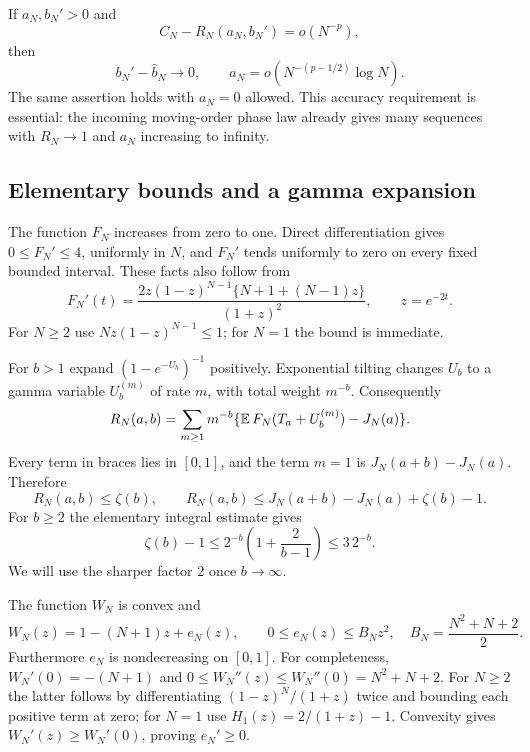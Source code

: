 \begin{theorem}\label{eul:thm:near}
If $a_N,b_N'>0$ and
\[
 C_N-R_N(a_N,b_N')=o(N^{-p}),
\]
then
\[
 b_N'-\widehat b_N\longrightarrow0,
 \qquad
 a_N=o\!\left(N^{-(p-1/2)}\log N\right).
\]
The same assertion holds with $a_N=0$ allowed.  This accuracy requirement
is essential: the incoming moving-order phase law already gives many
sequences with $R_N\to1$ and $a_N$ increasing to infinity.
\end{theorem}

\subsection{Elementary bounds and a gamma expansion}
The function $F_N$ increases from zero to one.  Direct differentiation
gives $0\leq F_N'\leq4$, uniformly in $N$, and $F_N'$ tends uniformly
to zero on every fixed bounded interval.  These facts also follow from
\[
 F_N'(t)=\frac{2z(1-z)^{N-1}\{N+1+(N-1)z\}}{(1+z)^2},
 \qquad z=e^{-2t}.
\]
For $N\geq2$ use $Nz(1-z)^{N-1}\leq1$; for $N=1$ the bound is
immediate.

For $b>1$ expand $(1-e^{-U_b})^{-1}$ positively.  Exponential tilting
changes $U_b$ to a gamma variable $U_b^{(m)}$ of rate $m$, with total
weight $m^{-b}$.  Consequently
\begin{equation}\label{eul:eq:seriesR}
 R_N(a,b)=\sum_{m\geq1}m^{-b}
  \{\operatorname{\mathbb E} F_N(T_a+U_b^{(m)})-J_N(a)\}.
\end{equation}
Every term in braces lies in $[0,1]$, and the term $m=1$ is
$J_N(a+b)-J_N(a)$.  Therefore
\begin{equation}\label{eul:eq:rough}
 R_N(a,b)\leq\zeta(b),\qquad
 R_N(a,b)\leq J_N(a+b)-J_N(a)+\zeta(b)-1.
\end{equation}
For $b\geq2$ the elementary integral estimate gives
\begin{equation}\label{eul:eq:zetabound}
 \zeta(b)-1\leq2^{-b}\left(1+\frac2{b-1}\right)\leq3\,2^{-b}.
\end{equation}
We will use the sharper factor $2$ once $b\to\infty$.

The function $W_N$ is convex and
\begin{equation}\label{eul:eq:etaylor}
 W_N(z)=1-(N+1)z+e_N(z),\qquad
 0\leq e_N(z)\leq B_Nz^2,
 \quad B_N=\frac{N^2+N+2}{2}.
\end{equation}
Furthermore $e_N$ is nondecreasing on $[0,1]$.
For completeness, $W_N'(0)=-(N+1)$ and
$0\leq W_N''(z)\leq W_N''(0)=N^2+N+2$.
For $N\geq2$ the latter follows by differentiating
$(1-z)^N/(1+z)$ twice and bounding each positive term at zero;
for $N=1$ use $H_1(z)=2/(1+z)-1$.
Convexity gives $W_N'(z)\geq W_N'(0)$, proving $e_N'\geq0$.

